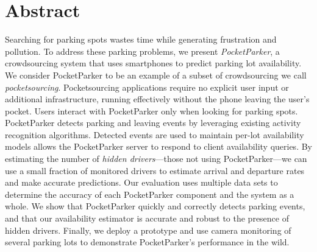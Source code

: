 \section*{Abstract}

Searching for parking spots wastes time while generating frustration and
pollution. To address these parking problems, we present
\textit{PocketParker}, a crowdsourcing system that uses smartphones to
predict parking lot availability. We consider PocketParker to be an example
of a subset of crowdsourcing we call \textit{pocketsourcing}. Pocketsourcing
applications require no explicit user input or additional infrastructure,
running effectively without the phone leaving the user's pocket. Users
interact with PocketParker only when looking for parking spots. PocketParker
detects parking and leaving events by leveraging existing activity
recognition algorithms. Detected events are used to maintain per-lot
availability models allows the PocketParker server to respond to client
availability queries. By estimating the number of \textit{hidden
drivers}---those not using PocketParker---we can use a small fraction of
monitored drivers to estimate arrival and departure rates and make accurate
predictions. Our evaluation uses multiple data sets to determine the accuracy
of each PocketParker component and the system as a whole. We show that
PocketParker quickly and correctly detects parking events, and that our
availability estimator is accurate and robust to the presence of hidden
drivers. Finally, we deploy a prototype and use camera monitoring of several
parking lots to demonstrate PocketParker's performance in the wild.
